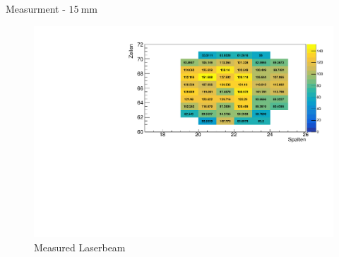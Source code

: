 \begin{frame}{ Measurment - $\SI{15}{\milli\meter}$ }

  \begin{figure}
    \centering
    \includegraphics[width=\textwidth]{./15_mm_measurment_plot.pdf}
    \caption{Measured Laserbeam }
    \label{ fig: 5_mm }
  \end{figure}

\end{frame}


